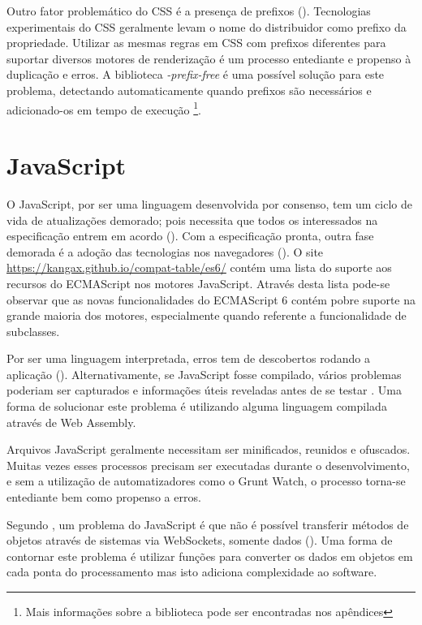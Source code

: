 Outro fator problemático do CSS é a presença de prefixos
(). Tecnologias experimentais do CSS geralmente
levam o nome do distribuidor como prefixo da propriedade. Utilizar as
mesmas regras em CSS com prefixos diferentes para suportar diversos
motores de renderização é um processo entediante e propenso à
duplicação e erros. A biblioteca \textit{-prefix-free} é uma
possível solução para este problema, detectando automaticamente
quando prefixos são necessários e adicionado-os em tempo de execução
\footnote{Mais informações sobre a biblioteca pode ser encontradas nos
apêndices}.

\section{JavaScript}

O JavaScript, por ser uma linguagem desenvolvida por consenso,
tem um ciclo de vida de atualizações demorado; pois necessita
que todos os interessados na especificação entrem em acordo
(). Com a especificação
pronta, outra fase demorada é a adoção das tecnologias
nos navegadores (). O site
\url{https://kangax.github.io/compat-table/es6/} contém uma lista do
suporte aos recursos do ECMAScript nos motores JavaScript. Através
desta lista pode-se observar que as novas funcionalidades do ECMAScript
6 contém pobre suporte na grande maioria dos motores, especialmente
quando referente a funcionalidade de subclasses.

Por ser uma linguagem interpretada, erros tem de descobertos rodando a
aplicação (). Alternativamente,
se JavaScript fosse compilado, vários problemas poderiam ser capturados
e informações úteis reveladas antes de se testar \autocite[p.
12]{viabilityBusinessApplications}. Uma forma de solucionar 
este problema é utilizando alguma linguagem compilada através de 
Web Assembly.

Arquivos JavaScript geralmente necessitam ser minificados, reunidos e
ofuscados. Muitas vezes esses processos precisam ser executadas durante
o desenvolvimento, e sem a utilização de automatizadores como o Grunt
Watch, o processo torna-se entediante bem como propenso a erros.

Segundo \citet{htmlResearchJournal}, um problema do JavaScript é que
não é possível transferir métodos de objetos através de sistemas
via WebSockets, somente dados ().
Uma forma de contornar este problema é utilizar funções para
converter os dados em objetos em cada ponta do processamento mas isto
adiciona complexidade ao software.

